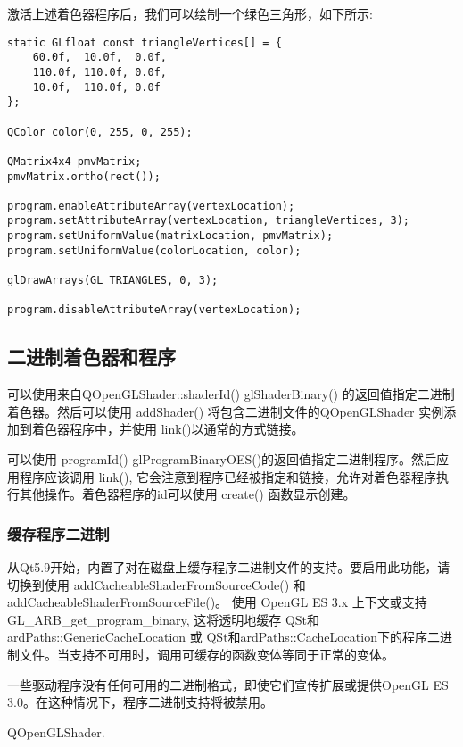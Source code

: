 激活上述着色器程序后，我们可以绘制一个绿色三角形，如下所示:

\begin{lstlisting}
static GLfloat const triangleVertices[] = {
    60.0f,  10.0f,  0.0f,
    110.0f, 110.0f, 0.0f,
    10.0f,  110.0f, 0.0f
};

QColor color(0, 255, 0, 255);

QMatrix4x4 pmvMatrix;
pmvMatrix.ortho(rect());

program.enableAttributeArray(vertexLocation);
program.setAttributeArray(vertexLocation, triangleVertices, 3);
program.setUniformValue(matrixLocation, pmvMatrix);
program.setUniformValue(colorLocation, color);

glDrawArrays(GL_TRIANGLES, 0, 3);

program.disableAttributeArray(vertexLocation);
\end{lstlisting}

\subsection{二进制着色器和程序}

可以使用来自QOpenGLShader::shaderId() glShaderBinary() 的返回值指定二进制着色器。然后可以使用 addShader() 将包含二进制文件的QOpenGLShader 实例添加到着色器程序中，并使用 link()以通常的方式链接。

可以使用 programId() glProgramBinaryOES()的返回值指定二进制程序。然后应用程序应该调用 link(), 它会注意到程序已经被指定和链接，允许对着色器程序执行其他操作。着色器程序的id可以使用 create() 函数显示创建。

\subsubsection{缓存程序二进制}

从Qt5.9开始，内置了对在磁盘上缓存程序二进制文件的支持。要启用此功能，请切换到使用 addCacheableShaderFromSourceCode() 和 addCacheableShaderFromSourceFile()。 使用 OpenGL ES 3.x 上下文或支持 GL\_ARB\_get\_program\_binary, 这将透明地缓存 QSt和ardPaths::GenericCacheLocation 或 QSt和ardPaths::CacheLocation下的程序二进制文件。当支持不可用时，调用可缓存的函数变体等同于正常的变体。

\begin{notice}
一些驱动程序没有任何可用的二进制格式，即使它们宣传扩展或提供OpenGL ES 3.0。在这种情况下，程序二进制支持将被禁用。
\end{notice}

\begin{seeAlso}
QOpenGLShader.
\end{seeAlso}

